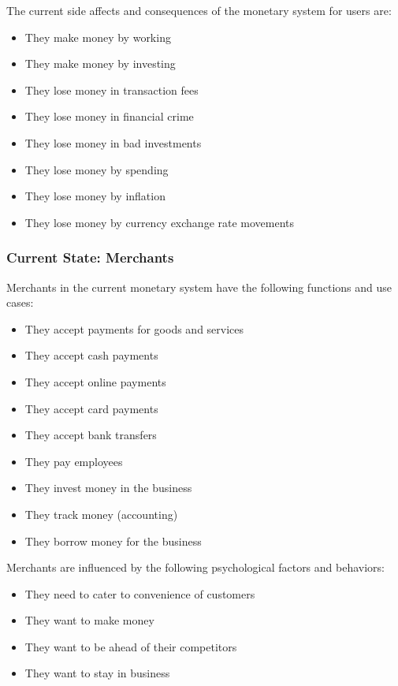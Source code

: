 \documentclass[12pt]{article} %
\begin{document}
{The current side affects and consequences of the monetary system for users are:

\begin{itemize}
	\item They make money by working
	\item They make money by investing
	\item They lose money in transaction fees
	\item They lose money in financial crime
	\item They lose money in bad investments
	\item They lose money by spending
	\item They lose money by inflation
	\item They lose money by currency exchange rate movements
\end{itemize}

\subsubsection{Current State: Merchants} \label{sssec:4.3:merchants}

Merchants in the current monetary system have the following functions and use cases:

\begin{itemize}
	\item They accept payments for goods and services
	\item They accept cash payments
	\item They accept online payments
	\item They accept card payments
	\item They accept bank transfers
	\item They pay employees
	\item They invest money in the business
	\item They track money (accounting)
	\item They borrow money for the business
\end{itemize}

Merchants are influenced by the following psychological factors and behaviors:

\begin{itemize}
	\item They need to cater to convenience of customers
	\item They want to make money
	\item They want to be ahead of their competitors
	\item They want to stay in business
\end{itemize}

}
\end{document}
